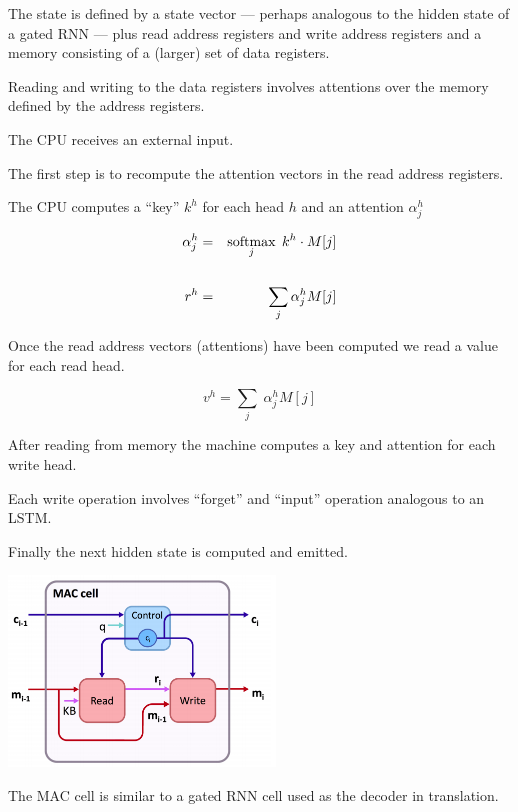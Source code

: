 {The state is defined by a state vector --- perhaps analogous to the hidden state of a gated RNN --- plus read address registers
and write address registers and a memory consisting of a (larger) set of data registers.

\vfill
Reading and writing to the data registers involves attentions over the memory defined by the address registers.



\vfill
The CPU receives an external input.

\vfill
The first step is to recompute the attention vectors in the read address registers.

\vfill
The CPU computes a ``key'' $k^h$ for each head $h$ and an attention $\alpha_j^h$

\begin{eqnarray*}
  \alpha^h_j & = & \operatorname*{softmax}_j\;k^h \cdot M[j] \\
  \\
  r^h & = & \sum_j \alpha_j^h M[j]
\end{eqnarray*}


Once the read address vectors (attentions) have been computed we read a value for each read head.

\vfill
$$v^h = \sum_j \;\alpha^h_j M[j]$$

After reading from memory the machine computes a key and attention for each write head.

\vfill
Each write operation involves ``forget'' and ``input'' operation analogous to an LSTM.

\vfill
Finally the next hidden state is computed and emitted.


\centerline{\includegraphics[height = 2.0in]{../images/MACcell}}

The MAC cell is similar to a gated RNN cell used as the decoder in translation.

}
